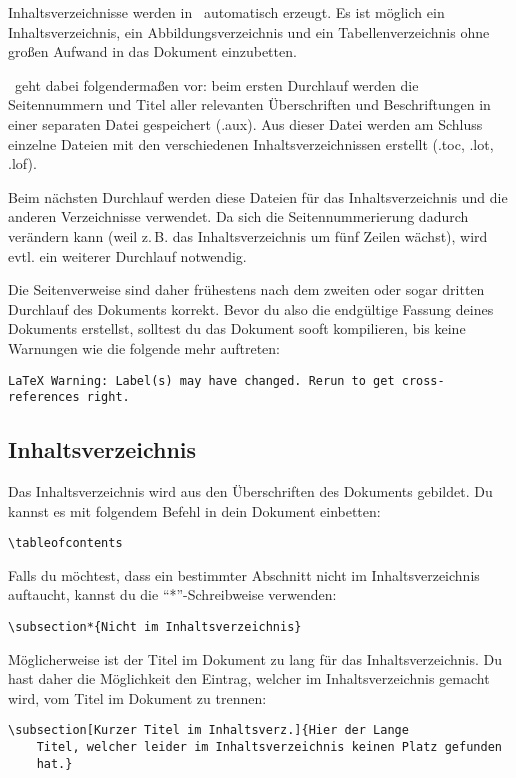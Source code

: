 Inhaltsverzeichnisse werden in \DMLLaTeX \ automatisch erzeugt. Es ist möglich ein Inhaltsverzeichnis, ein Abbildungsverzeichnis und ein Tabellenverzeichnis ohne großen Aufwand in das Dokument einzubetten.

\DMLLaTeX \ geht dabei folgendermaßen vor: beim ersten Durchlauf werden die Seitennummern und Titel aller relevanten Überschriften und Beschriftungen in einer separaten Datei gespeichert (.aux). Aus dieser Datei werden am Schluss einzelne Dateien mit den verschiedenen Inhaltsverzeichnissen erstellt (.toc, .lot, .lof).

Beim nächsten Durchlauf werden diese Dateien für das Inhaltsverzeichnis und die anderen Verzeichnisse verwendet. Da sich die Seitennummerierung dadurch verändern kann (weil z.\,B. das Inhaltsverzeichnis um fünf Zeilen wächst), wird evtl. ein weiterer Durchlauf notwendig.

Die Seitenverweise sind daher frühestens nach dem zweiten oder sogar dritten Durchlauf des Dokuments korrekt. Bevor du also die endgültige Fassung deines Dokuments erstellst, solltest du das Dokument sooft kompilieren, bis keine Warnungen wie die folgende mehr auftreten:
\begin{lstlisting}
LaTeX Warning: Label(s) may have changed. Rerun to get cross-references right.
\end{lstlisting}

\subsection{Inhaltsverzeichnis}

Das Inhaltsverzeichnis wird aus den Überschriften des Dokuments gebildet. Du kannst es mit folgendem Befehl in dein Dokument einbetten:
\begin{lstlisting}
\tableofcontents
\end{lstlisting}

Falls du möchtest, dass ein bestimmter Abschnitt nicht im Inhaltsverzeichnis auftaucht, kannst du die \enquote{*}-Schreibweise verwenden:
\begin{lstlisting}
\subsection*{Nicht im Inhaltsverzeichnis}
\end{lstlisting}

Möglicherweise ist der Titel im Dokument zu lang für das Inhaltsverzeichnis. Du hast daher die Möglichkeit den Eintrag, welcher im Inhaltsverzeichnis gemacht wird, vom Titel im Dokument zu trennen:
\begin{lstlisting}
\subsection[Kurzer Titel im Inhaltsverz.]{Hier der Lange
	Titel, welcher leider im Inhaltsverzeichnis keinen Platz gefunden
	hat.}
\end{lstlisting}
 

